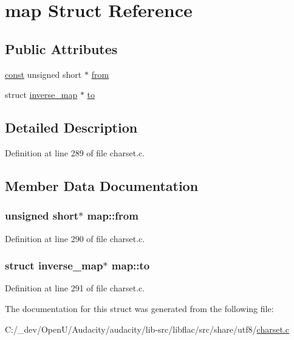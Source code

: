 \hypertarget{structmap}{}\section{map Struct Reference}
\label{structmap}
\subsection*{Public Attributes}
\begin{DoxyCompactItemize}
\item 
\hyperlink{getopt1_8c_a2c212835823e3c54a8ab6d95c652660e}{const} unsigned short $\ast$ \hyperlink{structmap_acc02387f2f1cdfcdbe821c7f1a1241aa}{from}
\item 
struct \hyperlink{structinverse__map}{inverse\+\_\+map} $\ast$ \hyperlink{structmap_a0ab58616d42e87e4b565ba7fbed693e5}{to}
\end{DoxyCompactItemize}


\subsection{Detailed Description}


Definition at line 289 of file charset.\+c.



\subsection{Member Data Documentation}
\subsubsection[{\texorpdfstring{from}{from}}]{ unsigned short$\ast$ map\+::from}\hypertarget{structmap_acc02387f2f1cdfcdbe821c7f1a1241aa}{}\label{structmap_acc02387f2f1cdfcdbe821c7f1a1241aa}


Definition at line 290 of file charset.\+c.

\subsubsection[{\texorpdfstring{to}{to}}]{\setlength{\rightskip}{0pt plus 5cm}struct {\bf inverse\+\_\+map}$\ast$ map\+::to}\hypertarget{structmap_a0ab58616d42e87e4b565ba7fbed693e5}{}\label{structmap_a0ab58616d42e87e4b565ba7fbed693e5}


Definition at line 291 of file charset.\+c.



The documentation for this struct was generated from the following file\+:\begin{DoxyCompactItemize}
\item 
C\+:/\+\_\+dev/\+Open\+U/\+Audacity/audacity/lib-\/src/libflac/src/share/utf8/\hyperlink{share_2utf8_2charset_8c}{charset.\+c}\end{DoxyCompactItemize}
